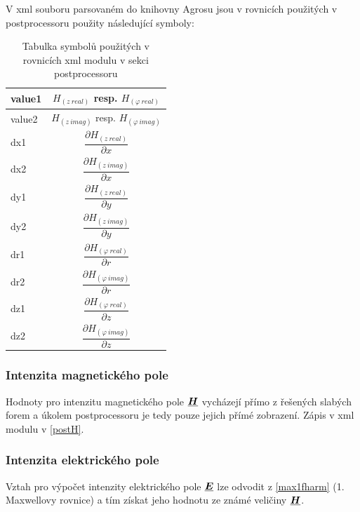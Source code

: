 \documentclass[12pt,a4paper,oneside]{article}
\numberwithin{equation}{section} %
\numberwithin{figure}{section} %
\numberwithin{table}{section} %
\renewcommand{\vec}[1]{\mbox{\boldmath$#1$}} %
\newcommand{\faz}[1]{{\underline{#1}}} %
\begin{document}
V xml souboru parsovaném do knihovny Agrosu jsou v rovnicích použitých v postprocessoru použity následující symboly:
\begin{table}[h] %
\caption{Tabulka symbolů použitých v rovnicích xml modulu v sekci postprocessoru}
\begin{center} %
\begin{tabular}{|l|c|} %
\hline %
value1 & $H _{(z~real)}$ resp. $H _{(\varphi ~real)}$ \\
\hline
value2 & $H _{(z~imag)}$ resp. $H _{(\varphi ~imag)}$ \\
\hline
dx1 & $\dfrac{\partial H _{(z~real)}}{\partial x}$ \\
\hline 
dx2 & $\dfrac{\partial H _{(z~imag)}}{\partial x}$ \\ 
\hline
dy1 & $\dfrac{\partial H _{(z~real)}}{\partial y}$ \\ 
\hline
dy2 & $\dfrac{\partial H _{(z~imag)}}{\partial y}$ \\ 
\hline
dr1 & $\dfrac{\partial H _{(\varphi ~real)}}{\partial r}$ \\ 
\hline 
dr2 & $\dfrac{\partial H _{(\varphi ~imag)}}{\partial r}$ \\ 
\hline
dz1 & $\dfrac{\partial H _{(\varphi ~real)}}{\partial z}$ \\ 
\hline
dz2 & $\dfrac{\partial H _{(\varphi ~imag)}}{\partial z}$ \\ 
\hline
\end{tabular}
\end{center}
\end{table} 



\subsubsection{Intenzita magnetického pole}
Hodnoty pro intenzitu magnetického pole $\faz{\vec{H}}$ vycházejí přímo z řešených slabých forem a úkolem postprocessoru je tedy pouze jejich přímé zobrazení. Zápis v xml modulu v \ref{postH}.

\subsubsection{Intenzita elektrického pole}
Vztah pro výpočet intenzity elektrického pole $\faz{\vec{E}}$ lze odvodit z \ref{max1fharm} (1. Maxwellovy rovnice) a tím získat jeho hodnotu ze známé veličiny $\faz{\vec{H}}$.
\end{document}
